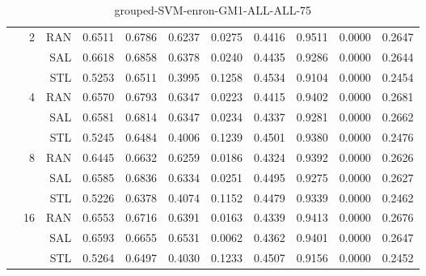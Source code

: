 \begin{center}
\begin{table}[htbp]
\begin{center}
\begin{tabular}{ | r | r | r | r | r | r | r | r | r | r | r |}
 & \multirow{3}{*}{2} & RAN & 0.6511 & 0.6786 & 0.6237 & 0.0275 & 0.4416 & 0.9511 & 0.0000 & 0.2647\\ \cline{3-11}
 &   & SAL & 0.6618 & 0.6858 & 0.6378 & 0.0240 & 0.4435 & 0.9286 & 0.0000 & 0.2644\\ \cline{3-11}
 &   & STL & 0.5253 & 0.6511 & 0.3995 & 0.1258 & 0.4534 & 0.9104 & 0.0000 & 0.2454\\ \cline{2-11}
 & \multirow{3}{*}{4} & RAN & 0.6570 & 0.6793 & 0.6347 & 0.0223 & 0.4415 & 0.9402 & 0.0000 & 0.2681\\ \cline{3-11}
 &   & SAL & 0.6581 & 0.6814 & 0.6347 & 0.0234 & 0.4337 & 0.9281 & 0.0000 & 0.2662\\ \cline{3-11}
 &   & STL & 0.5245 & 0.6484 & 0.4006 & 0.1239 & 0.4501 & 0.9380 & 0.0000 & 0.2476\\ \cline{2-11}
 & \multirow{3}{*}{8} & RAN & 0.6445 & 0.6632 & 0.6259 & 0.0186 & 0.4324 & 0.9392 & 0.0000 & 0.2626\\ \cline{3-11}
 &   & SAL & 0.6585 & 0.6836 & 0.6334 & 0.0251 & 0.4495 & 0.9275 & 0.0000 & 0.2627\\ \cline{3-11}
 &   & STL & 0.5226 & 0.6378 & 0.4074 & 0.1152 & 0.4479 & 0.9339 & 0.0000 & 0.2462\\ \cline{2-11}
 & \multirow{3}{*}{16} & RAN & 0.6553 & 0.6716 & 0.6391 & 0.0163 & 0.4339 & 0.9413 & 0.0000 & 0.2676\\ \cline{3-11}
 &   & SAL & 0.6593 & 0.6655 & 0.6531 & 0.0062 & 0.4362 & 0.9401 & 0.0000 & 0.2647\\ \cline{3-11}
 &   & STL & 0.5264 & 0.6497 & 0.4030 & 0.1233 & 0.4507 & 0.9156 & 0.0000 & 0.2452\\ \cline{2-11}
\hline
\end{tabular}
\caption{grouped-SVM-enron-GM1-ALL-ALL-75}
\end{center}
 \end{table}
\end{center}

